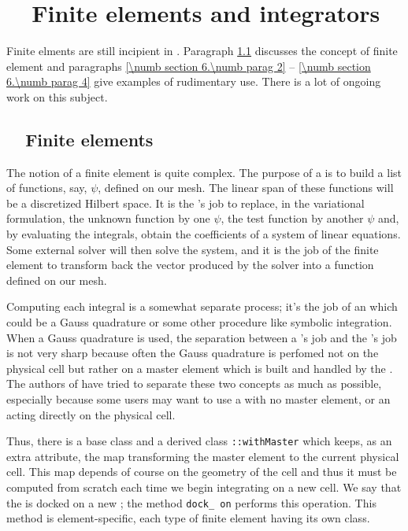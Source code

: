 
\chapter{~~Finite elements and integrators}\label{\numb section 6}


Finite elments are still incipient in \maniFEM.
Paragraph \ref{\numb section 6.\numb parag 1} discusses the concept of finite element
and paragraphs \ref{\numb section 6.\numb parag 2} -- \ref{\numb section 6.\numb parag 4}
give examples of rudimentary use.
There is a lot of ongoing work on this subject.


\section{~~Finite elements}\label{\numb section 6.\numb parag 1}

The notion of a finite element is quite complex.
The purpose of a {\small\tt {}} is to build a list of functions, say, $ \psi $,
defined on our mesh.
The linear span of these functions will be a discretized Hilbert space.
It is the {\small\tt {}}'s job to replace, in the variational formulation,
the unknown function by one $ \psi $, the test function by another $ \psi $ and,
by evaluating the integrals, obtain the coefficients of a system of linear equations.
Some external solver will then solve the system, and it is the job of the finite element
to transform back the vector produced by the solver into a function defined on our mesh.

Computing each integral is a somewhat separate process; it's the job of an
{\small\tt {}}
which could be a Gauss quadrature or some other procedure like symbolic integration.
When a Gauss quadrature is used, the separation between a {\small\tt {}}'s job
and the {\small\tt {}}'s job is not very sharp because often the Gauss quadrature is
perfomed not on the physical cell but rather on a master element which is built and
handled by the {\small\tt {}}.
The authors of {\maniFEM} have tried to separate these two concepts
as much as possible, especially because some users may want to use a {\small\tt {}}
with no master element, or an {\small\tt {}} acting directly on the physical cell.

Thus, there is a base class {\small\tt {}} and a derived class
{\small\tt {}::withMaster} which keeps, as an extra attribute, the map transforming
the master element to the current physical cell.
This map depends of course on the geometry of the cell and thus it must be computed from
scratch each time we begin integrating on a new cell.
We say that the {\small\tt {}} is docked on a new {\small\tt {}};
the method {\small\tt dock\_\,on} performs this operation.
This method is element-specific, each type of finite element having its own class.

